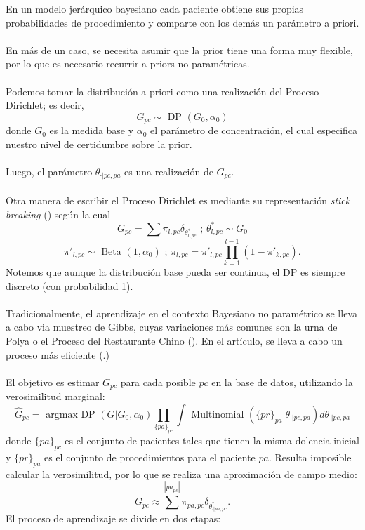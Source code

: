 \documentclass[11pt]{article}
\theoremstyle{plain}
\begin{document}
En un modelo jerárquico bayesiano cada paciente obtiene sus propias probabilidades de procedimiento y comparte con los demás un parámetro a priori.\\
\\
En más de un caso, se necesita asumir que la prior tiene una forma muy flexible, por lo que es necesario recurrir a priors no paramétricas.\\
\\
Podemos tomar la distribución a priori como una realización del Proceso Dirichlet; es decir, 
\[ G_{pc} \sim \textrm{ DP }(G_0,\alpha_0) \]
donde $G_0$ es la medida base y $\alpha_0$ el parámetro de concentración, el cual especifica nuestro nivel de certidumbre sobre la prior.\\
\\
Luego, el parámetro $\theta_{\cdot | pc, pa}$ es una realización de $G_{pc}$.\\
\\
Otra manera de escribir el Proceso Dirichlet es mediante su representación \textit{stick breaking} (\cite{teh2011dirichlet}) según la cual
\[ G_{pc} = \sum \pi_{l,pc} \delta_{\theta^\ast_{l,pc}} \textrm{ ;  } \theta^\ast_{l,pc} \sim G_0  \]
\[ \pi'_{l,pc} \sim \textrm{ Beta }(1,\alpha_0) \textrm{  ;  } \pi_{l,pc} = \pi'_{l,pc} \prod_{k=1}^{l-1} (1 - \pi'_{k,pc}).\]
Notemos que aunque la distribución base pueda ser continua, el DP es siempre discreto (con probabilidad 1).\\
\\
Tradicionalmente, el aprendizaje en el contexto Bayesiano no paramétrico se lleva a cabo via muestreo de Gibbs, cuyas variaciones más comunes son la urna de Polya o el Proceso del Restaurante Chino (\cite{teh2011dirichlet}). En el artículo, se lleva a cabo un proceso más eficiente (\cite{Yu:2004:NHB:1008992.1009053}.)\\
\\
El objetivo es estimar $G_{pc}$ para cada posible $pc$ en la base de datos, utilizando la verosimilitud marginal:
\[ \hat{G}_{pc} = \textrm{ argmax DP }(G | G_0, \alpha_0) \prod_{\{pa\}_{pc}} \int \textrm{ Multinomial }(\{pr\}_{pa}| \theta_{\cdot | pc,pa}) d\theta_{\cdot | pc,pa}  \]
donde $\{pa\}_{pc}$ es el conjunto de pacientes tales que tienen la misma dolencia inicial y $\{pr\}_{pa}$ es el conjunto de procedimientos para el paciente $pa$. Resulta imposible calcular la verosimilitud, por lo que se realiza una aproximación de campo medio:
\[ G_{pc} \approx \sum^{|{pa}_{pc}|} \pi_{pa,pc} \delta_{\theta^\ast_{\cdot | pa,pc}}. \]
El proceso de aprendizaje se divide en dos etapas: 
\end{document}
